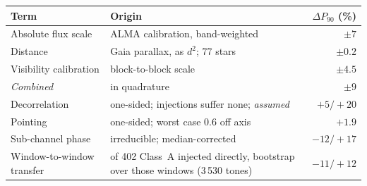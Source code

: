 \begin{tabular}{@{}l@{~}>{\raggedright\arraybackslash}p{}@{~}r@{}}
\hline
Term & Origin & $\Delta P_{90}$ (\%) \\
\hline
Absolute flux scale & ALMA calibration, band-weighted & $\pm7$ \\
Distance & Gaia parallax, as $d^{2}$; 77 stars & $\pm0.2$ \\
Visibility calibration & block-to-block scale & $\pm4.5$ \\
\hline
\emph{Combined} & in quadrature & $\pm9$ \\
\hline
Decorrelation & one-sided; injections suffer none; \emph{assumed} & $+5/+20$ \\
Pointing & one-sided; worst case 0.6\arcsec{} off axis & $+1.9$ \\
Sub-channel phase & irreducible; median-corrected & $-12/+17$ \\
Window-to-window transfer & 49 of 402 Class~A injected directly, bootstrap over those windows (3\,530 tones) & $-11/+12$ \\
\hline
\end{tabular}
